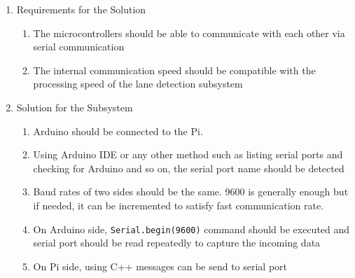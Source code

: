 \documentclass[a4paper,12pt]{article}
\begin{document}
	\begin{enumerate}
		\item {Requirements for the Solution}
		
		\begin{enumerate}
			\item The microcontrollers should be able to communicate with each other via serial communication
			\item The internal communication speed should be compatible with the processing speed of the lane detection subsystem  
		\end{enumerate}
	
	\item {Solution for the Subsystem}

		

	\begin{enumerate}
		\item Arduino should be connected to the Pi. \vspace{-0.2cm}
		\item Using Arduino IDE or any other method such as listing serial ports and checking for Arduino and so on, the serial port name should be detected \vspace{-0.2cm}
		\item Baud rates of two sides should be the same. 9600 is generally enough but if needed, it can be incremented to satisfy fast communication rate. \vspace{-0.2cm}
		\item On Arduino side, \texttt{Serial.begin(9600)} command should be executed and serial port should be read repeatedly to capture the incoming data \vspace{-0.2cm}
		\item On Pi side, using  C++ messages can be send to serial port
\end{enumerate}


\end{enumerate}
\end{document}
